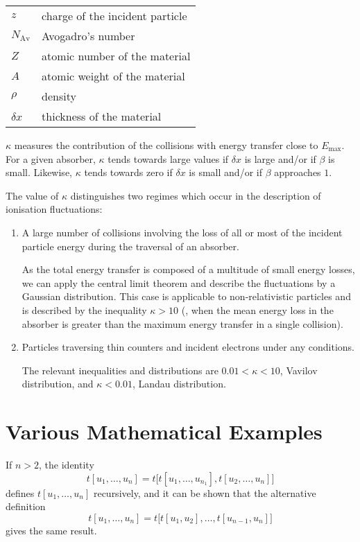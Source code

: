 \begin{tabular}{ll}
$z$ & charge of the incident particle \\
$N_{\mathrm{Av}}$ & Avogadro's number \\
$Z$ & atomic number of the material \\
$A$ & atomic weight of the material \\
$\rho$ & density \\
$ \delta x$ & thickness of the material \\
\end{tabular}

$\kappa$ measures the contribution of the collisions with energy transfer close to $E_{\mathrm{max}}$.  For a given absorber, $\kappa$ tends towards large values if $\delta x$ is large and/or if $\beta$ is small.  Likewise, $\kappa$ tends towards zero if $\delta x $ is small and/or if $\beta$ approaches $1$.

The value of $\kappa$ distinguishes two regimes which occur in the description of ionisation fluctuations:

\begin{enumerate}
\item A large number of collisions involving the loss of all or most of the incident particle energy during the traversal of an absorber.

As the total energy transfer is composed of a multitude of small energy losses, we can apply the central limit theorem and describe the fluctuations by a Gaussian distribution. This case is applicable to non-relativistic particles and is described by the inequality $\kappa > 10 $ (\ie, when the mean energy loss in the absorber is greater than the maximum energy transfer in a single collision).

\item Particles traversing thin counters and incident electrons under any conditions.

The relevant inequalities and distributions are $ 0.01 < \kappa < 10 $, Vavilov distribution, and $\kappa < 0.01 $, Landau distribution.
\end{enumerate}


\section{Various Mathematical Examples}

If $n > 2$, the identity \[t[u_1,\dots,u_n] = t\bigl[t[u_1,\dots,u_{n_1}], t[u_2,\dots,u_n] \bigr]\] defines $t[u_1,\dots,u_n]$ recursively, and it can be shown that the alternative definition \[t[u_1,\dots,u_n] = t\bigl[t[u_1,u_2],\dots,t[u_{n-1},u_n]\bigr]\] gives the same result.